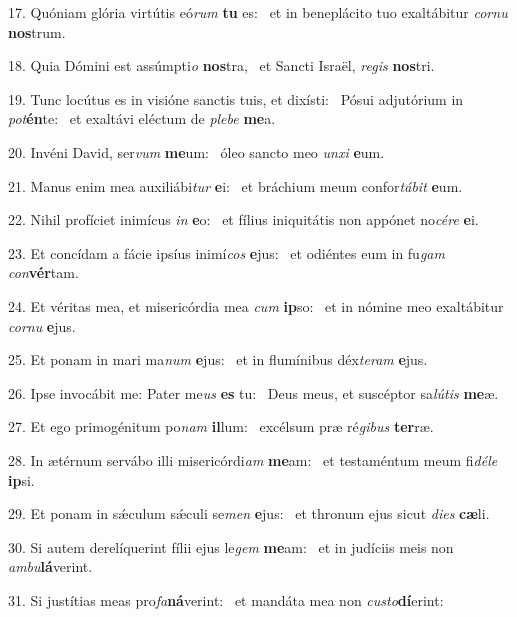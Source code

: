 17. Quóniam glória virtútis eó\textit{rum} \textbf{tu} es: \ast\  et in beneplácito tuo exaltábitur \textit{cor}\textit{nu} \textbf{nos}trum.\

18. Quia Dómini est assúmpti\textit{o} \textbf{nos}tra, \ast\  et Sancti Israël, \textit{re}\textit{gis} \textbf{nos}tri.\

19. Tunc locútus es in visióne sanctis tuis, et dixísti: \dag\  Pósui adjutórium in \textit{pot}\textbf{én}te: \ast\  et exaltávi eléctum de \textit{ple}\textit{be} \textbf{me}a.\

20. Invéni David, ser\textit{vum} \textbf{me}um: \ast\  óleo sancto meo \textit{un}\textit{xi} \textbf{e}um.\

21. Manus enim mea auxiliábi\textit{tur} \textbf{e}i: \ast\  et bráchium meum confor\textit{tá}\textit{bit} \textbf{e}um.\

22. Nihil profíciet inimícus \textit{in} \textbf{e}o: \ast\  et fílius iniquitátis non appónet no\textit{cé}\textit{re} \textbf{e}i.\

23. Et concídam a fácie ipsíus inimí\textit{cos} \textbf{e}jus: \ast\  et odiéntes eum in fu\textit{gam} \textit{con}\textbf{vér}tam.\

24. Et véritas mea, et misericórdia mea \textit{cum} \textbf{ip}so: \ast\  et in nómine meo exaltábitur \textit{cor}\textit{nu} \textbf{e}jus.\

25. Et ponam in mari ma\textit{num} \textbf{e}jus: \ast\  et in flumínibus déx\textit{te}\textit{ram} \textbf{e}jus.\

26. Ipse invocábit me: Pater me\textit{us} \textbf{es} tu: \ast\  Deus meus, et suscéptor sa\textit{lú}\textit{tis} \textbf{me}æ.\

27. Et ego primogénitum po\textit{nam} \textbf{il}lum: \ast\  excélsum præ ré\textit{gi}\textit{bus} \textbf{ter}ræ.\

28. In ætérnum servábo illi misericórdi\textit{am} \textbf{me}am: \ast\  et testaméntum meum fi\textit{dé}\textit{le} \textbf{ip}si.\

29. Et ponam in sǽculum sǽculi se\textit{men} \textbf{e}jus: \ast\  et thronum ejus sicut \textit{di}\textit{es} \textbf{cæ}li.\

30. Si autem derelíquerint fílii ejus le\textit{gem} \textbf{me}am: \ast\  et in judíciis meis non \textit{am}\textit{bu}\textbf{lá}verint.\

31. Si justítias meas pro\textit{fa}\textbf{ná}verint: \ast\  et mandáta mea non \textit{cus}\textit{to}\textbf{dí}erint:\

